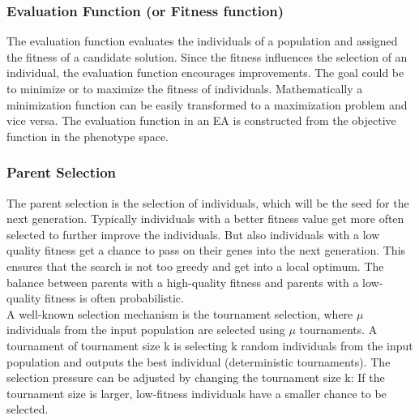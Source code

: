         \subsubsection{Evaluation Function (or Fitness function)}
        The evaluation function evaluates the individuals of a population and assigned the fitness of a candidate solution. Since the fitness influences the selection of an individual, the evaluation function encourages improvements. The goal could be to minimize or to maximize the fitness of individuals. Mathematically a minimization function can be easily transformed to a maximization problem and vice versa. The evaluation function in an EA is constructed from the objective function in the phenotype space.
        
        \subsubsection{Parent Selection}
        \label{sec:parentSelection}
        The parent selection is the selection of individuals, which will be the seed for the next generation. Typically individuals with a better fitness value get more often selected to further improve the individuals. But also individuals with a low quality fitness get a chance to pass on their genes into the next generation. This ensures that the search is not too greedy and get into a local optimum. The balance between parents with a high-quality fitness and parents with a low-quality fitness is often probabilistic.\\
        A well-known selection mechanism is the tournament selection, where $\mu$ individuals from the input population are selected using $\mu$ tournaments. A tournament of tournament size k is selecting k random individuals from the input population and outputs the best individual (deterministic tournaments)\cite{Eiben}. The selection pressure can be adjusted by changing the tournament size k: If the tournament size is larger, low-fitness individuals have a smaller chance to be selected.
           

